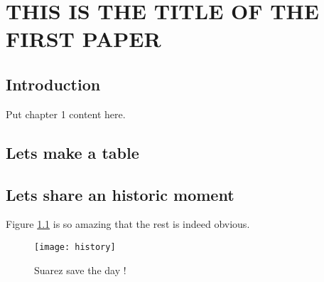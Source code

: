 

\chapter{THIS IS THE TITLE OF THE FIRST PAPER}

\section{Introduction}
Put chapter 1 content here.

\section{Lets make a table} 
 

\section{Lets share an historic moment}

Figure \ref{history} is so amazing  that the rest is indeed obvious.

\begin{figure}[h!tb] \centering
\texttt{[image: history]}
\caption{Suarez save the day !}
\label{history}
\end{figure}

